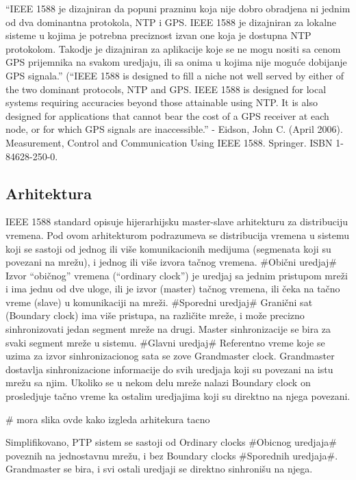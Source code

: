 \documentclass[a4paper,12pt, master]{etf}
\begin{document}
	``IEEE 1588 je dizajniran da popuni prazninu koja nije dobro obradjena ni jednim od dva
	dominantna protokola, NTP i GPS\@. IEEE 1588 je dizajniran za lokalne sisteme u kojima je
	potrebna preciznost izvan one koja je dostupna NTP protokolom. Takodje je dizajniran za
	aplikacije koje se ne mogu nositi sa cenom GPS prijemnika na svakom uredjaju, ili sa onima
        u kojima nije mogu\'{c}e dobijanje GPS signala.'' (``IEEE 1588 is designed to fill a niche
        not well served by either of the two dominant protocols, NTP and GPS\@. IEEE 1588 is designed
        for local systems requiring accuracies beyond those attainable using NTP\@. It is also designed
        for applications that cannot bear the cost of a GPS receiver at each node, or for which GPS
        signals are inaccessible.'' - Eidson, John C. (April 2006). Measurement, Control and
        Communication Using IEEE 1588. Springer. ISBN 1-84628-250-0.

        \subsection{Arhitektura}

	IEEE 1588 standard opisuje hijerarhijsku master-slave arhitekturu za distribuciju vremena.
	Pod	ovom arhitekturom podrazumeva se distribucija vremena u sistemu koji se sastoji od
	jednog ili vi\v{s}e komunikacionih medijuma (segmenata koji su povezani na mre\v{z}u), i jednog
        ili vi\v{s}e izvora ta\v{c}nog vremena. \#Obi\v{c}ni uredjaj\# Izvor ``obi\v{c}nog'' vremena
        (``ordinary clock'') je uredjaj sa jednim pristupom mre\v{z}i i ima jednu od dve uloge, ili je
        izvor (master) ta\v{c}nog vremena, ili \v{c}eka na ta\v{c}no vreme (slave) u komunikaciji na
        mre\v{z}i. \#Sporedni uredjaj\# Grani\v{c}ni sat (Boundary	clock) ima vi\v{s}e pristupa, na
        razli\v{c}ite mre\v{z}e, i mo\v{z}e precizno sinhronizovati jedan segment mre\v{z}e na drugi.
        Master sinhronizacije se bira za svaki segment mre\v{z}e u sistemu. \#Glavni uredjaj\#
        Referentno vreme koje se uzima za izvor sinhronizacionog sata se zove Grandmaster clock.
        Grandmaster dostavlja sinhronizacione informacije do svih uredjaja koji su povezani na istu
        mre\v{z}u sa njim. Ukoliko se u nekom delu mre\v{z}e nalazi Boundary clock on prosledjuje
        ta\v{c}no vreme ka ostalim uredjajima koji su direktno na njega povezani.

	\# mora slika ovde kako izgleda arhitekura tacno

	Simplifikovano, PTP sistem se sastoji od Ordinary clocks \#Obicnog uredjaja\# poveznih na
	jednostavnu mre\v{z}u, i bez Boundary clocks \#Sporednih uredjaja\#. Grandmaster se bira, i svi
	ostali uredjaji se direktno sinhroni\v{s}u na njega.
\end{document}
